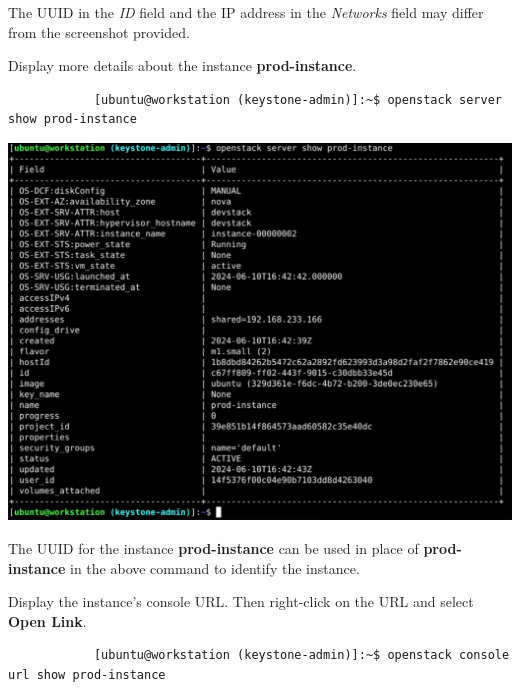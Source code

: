 \documentclass[letterpaper, 12pt]{article}
\begin{document}
\begin{enumerate}
    \begin{notebox}
        The UUID in the \textit{ID} field and the IP address in the \textit{Networks} field may differ from the screenshot provided.
    \end{notebox}

    \begin{labstep}
        Display more details about the instance \textbf{prod-instance}.
        \begin{lstlisting}
            [ubuntu@workstation (keystone-admin)]:~$ openstack server show prod-instance
        \end{lstlisting}

        \begin{center}
            \includegraphics[width=\linewidth]{images/part2/step9.png}
        \end{center}
    \end{labstep}

    \begin{tipbox}
        The UUID for the instance \textbf{prod-instance} can be used in place of \textbf{prod-instance} in the above command to identify the instance.
    \end{tipbox}

    \begin{labstep}
        Display the instance's console URL.
        Then right-click on the URL and select \textbf{Open Link}.
        \begin{lstlisting}
            [ubuntu@workstation (keystone-admin)]:~$ openstack console url show prod-instance
        \end{lstlisting}


\end{labstep}
\end{enumerate}
\end{document}

